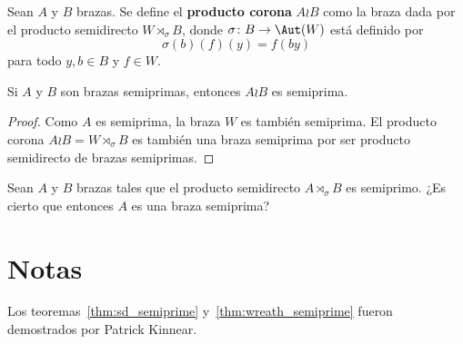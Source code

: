 \begin{definition}
    Sean $A$ y $B$ brazas. Se define el \textbf{producto corona} $A\wr B$ como la braza
    dada por el producto semidirecto $W\rtimes_{\sigma} B$, donde
    $\sigma\colon B\to\Aut(W)$ está definido por
    \[
    \sigma(b)(f)(y)=f(by)
    \]
    para todo $y,b\in B$ y $f\in W$.
\end{definition}

\begin{theorem}
\label{thm:wreath_semiprime}
Si $A$ y $B$ son brazas semiprimas, entonces $A\wr B$ es semiprima.
\end{theorem}

\begin{proof}
Como $A$ es semiprima, la braza $W$ es también semiprima. El producto corona 
$A\wr B=W\rtimes_{\sigma}B$ es también una braza semiprima por ser producto semidirecto de brazas semiprimas.
\end{proof}

\begin{question}
Sean $A$ y $B$ brazas tales que el producto semidirecto $A\rtimes_{\sigma}B$ es semiprimo. ¿Es cierto que entonces $A$ es una braza semiprima?
\end{question}

\section*{Notas}

Los teoremas~\ref{thm:sd_semiprime} y~\ref{thm:wreath_semiprime} 
fueron demostrados por Patrick Kinnear.